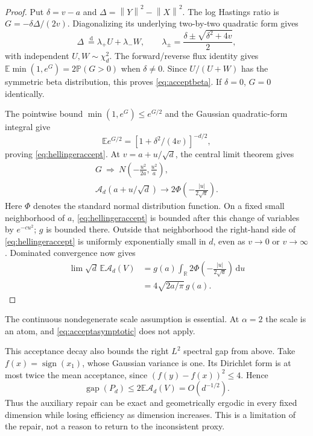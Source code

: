 \documentclass[pdflatex,iicol,sn-mathphys-ay]{sn-jnl}
\theoremstyle{definition}\newtheorem{definition}[theorem]{Definition}
\theoremstyle{remark}\newtheorem{remark}[theorem]{Remark}
\numberwithin{equation}{section}
\newcommand{\R}{\mathbb R}\newcommand{\E}{\mathbb E}\newcommand{\Prob}{\mathbb P}
\newcommand{\norm}[1]{\left\lVert#1\right\rVert}\newcommand{\TV}{\mathrm{TV}}
\newcommand{\dd}{\,\mathrm d}\newcommand{\cA}{c_\alpha}\newcommand{\sg}{\operatorname{sigmoid}}
\newcommand{\gap}{\operatorname{gap}}\newcommand{\osc}{\operatorname{osc}}
\newcommand{\1}{\mathbf 1}
\begin{document}
\begin{proof}
Put $\delta=v-a$ and $\Delta=\norm Y^2-\norm X^2$. The log Hastings ratio is $G=-\delta\Delta/(2v)$. Diagonalizing its underlying two-by-two quadratic form gives
\[
\Delta\ \stackrel{\mathrm d}=\lambda_+U+\lambda_-W,\qquad
\lambda_\pm=\frac{\delta\pm\sqrt{\delta^2+4v}}2,
\]
with independent $U,W\sim\chi_d^2$. The forward/reverse flux identity gives $\E\min(1,e^G)=2\Prob(G>0)$ when $\delta\ne0$. Since $U/(U+W)$ has the symmetric beta distribution, this proves \eqref{eq:acceptbeta}. If $\delta=0$, $G=0$ identically.

The pointwise bound $\min(1,e^G)\le e^{G/2}$ and the Gaussian quadratic-form integral give
\[
\E e^{G/2}=\left[1+\delta^2/(4v)\right]^{-d/2},
\]
proving \eqref{eq:hellingeraccept}. At $v=a+u/\sqrt d$, the central limit theorem gives
\[
\begin{gathered}
G\ \Longrightarrow\ N\left(-\frac{u^2}{2a},\frac{u^2}{a}\right),\\
\mathcal A_d(a+u/\sqrt d)\longrightarrow 2\Phi\left(-\frac{|u|}{2\sqrt a}\right).
\end{gathered}
\]
Here $\Phi$ denotes the standard normal distribution function. On a fixed small neighborhood of $a$, \eqref{eq:hellingeraccept} is bounded after this change of variables by $e^{-cu^2}$; $g$ is bounded there. Outside that neighborhood the right-hand side of \eqref{eq:hellingeraccept} is uniformly exponentially small in $d$, even as $v\to0$ or $v\to\infty$. Dominated convergence now gives
\[
\begin{aligned}
\lim\sqrt d\,\E\mathcal A_d(V)
 &=g(a)\int_\R2\Phi\left(-\frac{|u|}{2\sqrt a}\right)\dd u\\
 &=4\sqrt{2a/\pi}\,g(a).
\end{aligned}
\]
\end{proof}
The continuous nondegenerate scale assumption is essential. At $\alpha=2$ the scale is an atom, and \eqref{eq:acceptasymptotic} does not apply.

This acceptance decay also bounds the right $L^2$ spectral gap from above. Take $f(x)=\operatorname{sign}(x_1)$, whose Gaussian variance is one. Its Dirichlet form is at most twice the mean acceptance, since $(f(y)-f(x))^2\le4$. Hence
\begin{equation}
\gap(P_d)\le2\E\mathcal A_d(V)=O(d^{-1/2}).\label{eq:gapupper}
\end{equation}
Thus the auxiliary repair can be exact and geometrically ergodic in every fixed dimension while losing efficiency as dimension increases. This is a limitation of the repair, not a reason to return to the inconsistent proxy.
\end{document}
